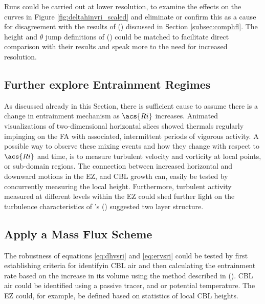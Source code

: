 Runs could be carried out at lower resolution, to examine the effects on the curves in Figure \ref{fig:deltahinvri_scaled} and eliminate or confirm this as a cause for disagreement with the results of \citeauthor{FedConzMir04} (\citeyear{FedConzMir04}) discussed in Section \ref{subsec:comphfl}.  The height and $\theta$ jump definitions of \citeauthor{GarciaMellado} (\citeyear{GarciaMellado}) could be matched to facilitate direct comparison with their results and speak more to the need for increased resolution.

\subsection{Further explore Entrainment Regimes}

As discussed already in this Section, there is sufficient cause to assume there is a change in entrainment mechanism as $\acs{Ri}$ increases.  Animated visualizations of two-dimensional horizontal slices showed thermals regularly impinging on the \acs{FA} with associated, intermittent periods of vigorous activity.  A possible way to observe these mixing events and how they change with respect to $\acs{Ri}$ and time, is to measure turbulent velocity and vorticity at local points, or sub-domain regions.  The connection between increased horizontal and downward motions in the \acs{EZ}, and \acs{CBL} growth can, easily be tested by concurrently measuring the local height. Furthermore, turbulent activity measured at different levels within the \acs{EZ} could shed further light on the turbulence characteristics of \citeauthor{GarciaMellado}'s (\citeyear{GarciaMellado}) suggested two layer structure.\\     

\subsection{Apply a Mass Flux Scheme}

The robustness of equations \ref{eq:dhvsri} and \ref{eq:ervsri} could be tested by first establishing criteria for identifyin \acs{CBL} air and then calculating the entrainment rate based on the increase in its volume using the method described in \citeauthor{DawAus} (\citeyear{DawAus}).  \acs{CBL} air could be identified using a passive tracer, and or potential temperature.  The \acs{EZ} could, for example, be defined based on statistics of local \acs{CBL} heights.   

\FloatBarrier


\endinput

Any text after an \endinput is ignored.
You could put scraps here or things in progress.
